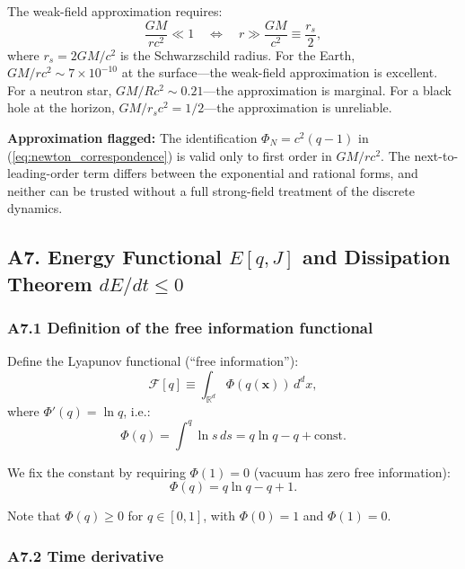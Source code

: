 \documentclass[reprint]{revtex4-2}
\begin{document}
The weak-field approximation requires:
\begin{equation}
\frac{GM}{rc^2} \ll 1 \quad\Longleftrightarrow\quad r \gg \frac{GM}{c^2} \equiv \frac{r_s}{2},
\end{equation}
where $r_s = 2GM/c^2$ is the Schwarzschild radius. For the Earth, $GM/rc^2 \sim 7\times 10^{-10}$ at the surface---the weak-field approximation is excellent. For a neutron star, $GM/Rc^2 \sim 0.21$---the approximation is marginal. For a black hole at the horizon, $GM/r_s c^2 = 1/2$---the approximation is unreliable.

\textbf{Approximation flagged:} The identification $\Phi_N = c^2(q-1)$ in (\ref{eq:newton_correspondence}) is valid only to first order in $GM/rc^2$. The next-to-leading-order term differs between the exponential and rational forms, and neither can be trusted without a full strong-field treatment of the discrete dynamics.

\subsection{A7. Energy Functional $E[q,J]$ and Dissipation Theorem $dE/dt \le 0$}

\subsubsection{A7.1 Definition of the free information functional}

Define the Lyapunov functional (``free information''):
\begin{equation}
\mathcal{F}[q] \equiv \int_{\mathbb{R}^d} \Phi(q(\mathbf{x}))\,d^d x,
\end{equation}
where $\Phi'(q) = \ln q$, i.e.:
\begin{equation}
\Phi(q) = \int^q \ln s\,ds = q\ln q - q + \text{const}.
\end{equation}

We fix the constant by requiring $\Phi(1)=0$ (vacuum has zero free information):
\begin{equation}
\Phi(q) = q\ln q - q + 1.
\end{equation}

Note that $\Phi(q) \ge 0$ for $q\in[0,1]$, with $\Phi(0)=1$ and $\Phi(1)=0$.

\subsubsection{A7.2 Time derivative}
\end{document}
